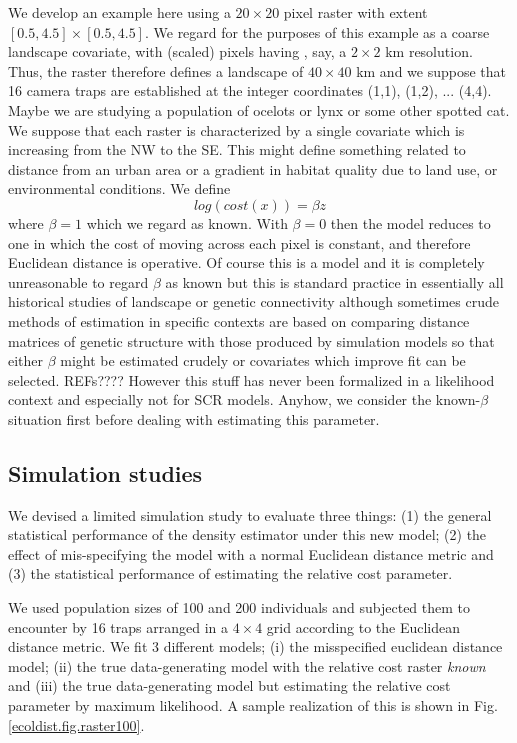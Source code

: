 We develop an example here using a $20 \times 20$ pixel raster with
extent $[0.5, 4.5] \times [0.5, 4.5]$.
We regard for the purposes of this example as a coarse landscape 
covariate, with (scaled) pixels having ,  say, a $2 \times 2$ km resolution. Thus, the raster
therefore
defines a landscape of $40 \times 40$ km and we suppose that 16 camera
traps are established at the integer coordinates (1,1), (1,2),
... (4,4). 
Maybe we are studying a population of ocelots or lynx or some other
spotted cat.
We suppose 
that each raster is characterized by a single covariate which is increasing 
from the NW to the SE. This might define something related to distance
from an urban area or a gradient in habitat quality due to land use,
or environmental conditions. 
We define 
\[
 log(cost(x))=  \beta z 
 \]
where $\beta = 1$ which we regard as known. With $\beta=0$ then the model reduces to
one in which the cost of moving across each pixel is constant, and therefore Euclidean
distance is operative.
 Of course this is a model and it is completely
unreasonable to regard $\beta$ as known but this is standard practice in essentially all
historical studies of landscape or genetic connectivity although sometimes crude methods
of estimation in specific contexts are based on comparing distance matrices of genetic
structure with those produced by simulation models so that either $\beta$ might be estimated
crudely or covariates which improve fit can be selected. REFs????
However this stuff has never been formalized in a likelihood context and especially
not for SCR models. 
Anyhow, we consider the known-$\beta$ situation first before dealing with estimating
this parameter. 


\subsection{Simulation studies}

We devised a limited simulation study to evaluate three things: (1)
the general statistical performance of the density estimator under
this new model; (2) the effect of mis-specifying the model with a
normal Euclidean distance metric and (3) the statistical performance
of estimating the relative cost parameter.

We used population sizes of 100 and 200 individuals and subjected them
to encounter by 16 traps arranged in a $4\times 4$ grid according to
the Euclidean distance metric. We fit 3 different models; (i) the
misspecified euclidean distance model; (ii) the true data-generating
model with the relative cost raster {\it known} and (iii) the true
data-generating model but estimating the relative cost parameter by
maximum likelihood.  A sample realization of this is shown in Fig.
\ref{ecoldist.fig.raster100}.

